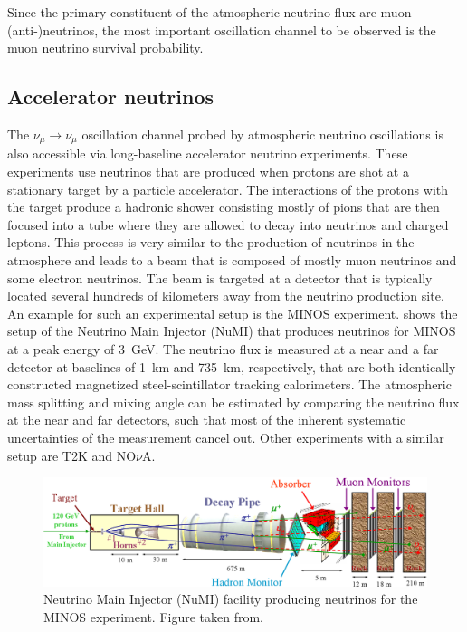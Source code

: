 Since the primary constituent of the atmospheric neutrino flux are muon (anti-)neutrinos, the most important oscillation channel to be observed is the muon neutrino survival probability.

\subsection{Accelerator neutrinos}
The $\nu_\mu \rightarrow \nu_\mu$ oscillation channel probed by atmospheric neutrino oscillations is also accessible via long-baseline accelerator neutrino experiments. These experiments use neutrinos that are produced when protons are shot at a stationary target by a particle accelerator. The interactions of the protons with the target produce a hadronic shower consisting mostly of pions that are then focused into a tube where they are allowed to decay into neutrinos and charged leptons. This process is very similar to the production of neutrinos in the atmosphere and leads to a beam that is composed of mostly muon neutrinos and some electron neutrinos. The beam is targeted at a detector that is typically located several hundreds of kilometers away from the neutrino production site. An example for such an experimental setup is the MINOS experiment\cite{MICHAEL2008190}.  shows the setup of the Neutrino Main Injector (NuMI) that produces neutrinos for MINOS at a peak energy of \SI{3}{GeV}. The neutrino flux is measured at a near and a far detector at baselines of \SI{1}{km} and \SI{735}{km}, respectively, that are both identically constructed magnetized steel-scintillator tracking calorimeters. The atmospheric mass splitting and mixing angle can be estimated by comparing the neutrino flux at the near and far detectors, such that most of the inherent systematic uncertainties of the measurement cancel out. Other experiments with a similar setup are T2K\cite{T2K:2011qtm} and NO$\nu$A\cite{Patterson:2012zs}. 
\begin{figure}
    \centering
    \includegraphics{figures/theory/numi_beam.png}
    \caption{Neutrino Main Injector (NuMI) facility producing neutrinos for the MINOS experiment. Figure taken from\cite{osti_879065}.\label{fig:numi-beam}}
\end{figure}


